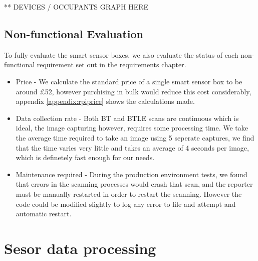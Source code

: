 \documentclass{l4proj}
\begin{document}
** DEVICES / OCCUPANTS GRAPH HERE


\subsection{Non-functional Evaluation}
To fully evaluate the smart sensor boxes, we also evaluate the status of each non-functional requirement set out in the requirements chapter.

\begin{itemize}	
  \item Price - We calculate the standard price of a single smart sensor box to be around £52, however purchising in bulk would reduce this cost considerably, appendix \ref{appendix:rpiprice} shows the calculations made.
  \item Data collection rate - Both BT and BTLE scans are continuous which is ideal, the image capturing however, requires some processing time. We take the average time required to take an image using 5 seperate captures, we find that the time varies very little and takes an average of 4 seconds per image, which is definetely fast enough for our needs. 
  \item Maintenance required - During the production environment tests, we found that errors in the scanning processes would crash that scan, and the reporter must be manually restarted in order to restart the scanning. However the code could be modified slightly to log any error to file and attempt and automatic restart.
\end{itemize}




\section{Sesor data processing}
\end{document}

